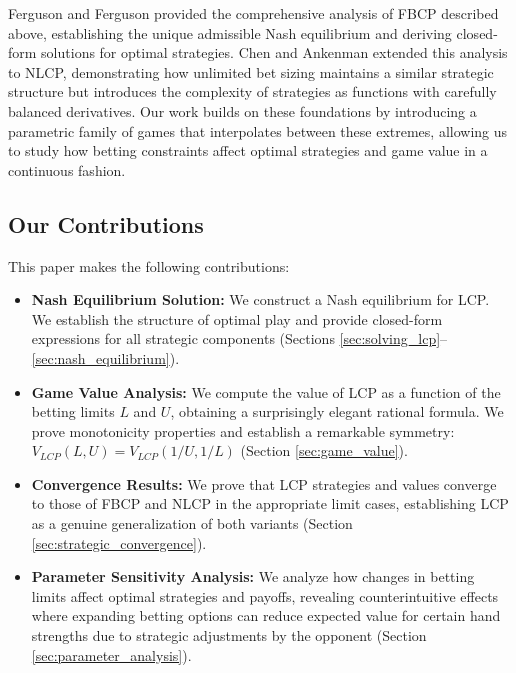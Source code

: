 \documentclass[../../main/main.tex]{subfiles}
\begin{document}
Ferguson and Ferguson \cite{ferguson2003borel} provided the comprehensive analysis of FBCP described above, establishing the unique admissible Nash equilibrium and deriving closed-form solutions for optimal strategies. Chen and Ankenman \cite{chen2006mathematics} extended this analysis to NLCP, demonstrating how unlimited bet sizing maintains a similar strategic structure but introduces the complexity of strategies as functions with carefully balanced derivatives. Our work builds on these foundations by introducing a parametric family of games that interpolates between these extremes, allowing us to study how betting constraints affect optimal strategies and game value in a continuous fashion.

\subsection{Our Contributions}

This paper makes the following contributions:

\begin{itemize}
    \item \textbf{Nash Equilibrium Solution:} We construct a Nash equilibrium for LCP. We establish the structure of optimal play and provide closed-form expressions for all strategic components (Sections \ref{sec:solving_lcp}--\ref{sec:nash_equilibrium}).

    \item \textbf{Game Value Analysis:} We compute the value of LCP as a function of the betting limits $L$ and $U$, obtaining a surprisingly elegant rational formula. We prove monotonicity properties and establish a remarkable symmetry: $V_{LCP}(L, U) = V_{LCP}(1/U, 1/L)$ (Section \ref{sec:game_value}).
    
    \item \textbf{Convergence Results:} We prove that LCP strategies and values converge to those of FBCP and NLCP in the appropriate limit cases, establishing LCP as a genuine generalization of both variants (Section \ref{sec:strategic_convergence}).

    \item \textbf{Parameter Sensitivity Analysis:} We analyze how changes in betting limits affect optimal strategies and payoffs, revealing counterintuitive effects where expanding betting options can reduce expected value for certain hand strengths due to strategic adjustments by the opponent (Section \ref{sec:parameter_analysis}).
\end{itemize}
\end{document}
